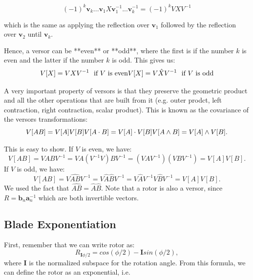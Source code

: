 \begin{displaymath}
    (-1)^k\mathbf v_k...\mathbf v_1  X  \mathbf v_1^{-1}...\mathbf v_k^{-1} =(-1)^k V  X V^{-1}
\end{displaymath}

which is the same as applying the reflection over $\mathbf v_1$ followed by the reflection over $\mathbf v_2$ until $\mathbf v_k$.

Hence, a versor can be **even** or **odd**, where the first is if the number $k$ is even and the latter if the number $k$
is odd. This gives us:
\begin{displaymath}
    V[X] = V X V^{-1} \ \text{ if }V \text{ is even}\\
    V[X] = V \hat{X} V^{-1} \ \text{ if }V \text{ is odd}\\
\end{displaymath}

A very important property of versors is that they preserve the geometric product and all the other operations
that are built from it (e.g. outer prodct, left contraction, right contraction, scalar product).
This is known as the covariance of the versors transformations:
\begin{displaymath}
    V[A B] = V[A]V[B]\\
    V[A \cdot B] = V[A]\cdot V[B]\\
    V[A \wedge B] = V[A]\wedge V[B].
\end{displaymath}

This is easy to show. If $V$ is even, we have:
\begin{displaymath}
    V[A B] = V A B V^{-1} = V A (V^{-1} V) B V^{-1} =(V A V^{-1}) (V B V^{-1}) = V[A] V[B].
\end{displaymath}
If $V$ is odd, we have:
\begin{displaymath}
    V[A B] = V \widehat{A B} V^{-1} = V \hat{A} \hat{B} V^{-1} =V \hat{A} V^{-1} V \hat{B} V^{-1} = V[A] V[B].
\end{displaymath}
We used the fact that $\widehat{A B} = \hat{A} \hat{B}$.
Note that a rotor is also a versor, since $R = \mathbf b_n \mathbf a_n^{-1}$ which are both invertible vectors.

\subsection{Blade Exponentiation}

First, remember that we can write rotor as:
\begin{displaymath}
    R_{\mathbf I \phi/2} = cos(\phi/2) - \mathbf I sin(\phi/2),
\end{displaymath}
where $\mathbf I$ is the normalized subspace for the rotation angle.
From this formula, we can define the rotor as an exponential, i.e.

